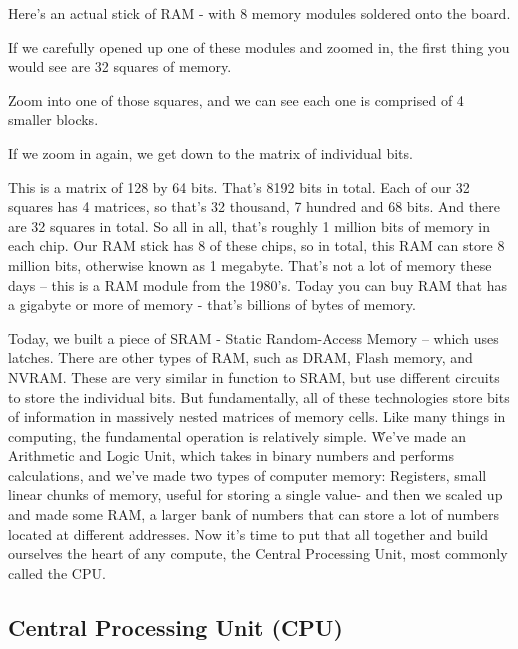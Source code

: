 \be
Here's an actual stick of RAM - with 8 memory modules soldered onto the board.


If we carefully opened up one of these modules and zoomed in, the first thing you would see are 32 squares of memory.


Zoom into one of those squares, and we can see each one is comprised of 4 smaller blocks.


If we zoom in again, we get down to the matrix of individual bits.


This is a matrix of 128 by 64 bits. That's 8192 bits in total. Each of our 32 squares has 4 matrices, so that's 32
thousand, 7 hundred and 68 bits. And there are 32 squares in total. So all in all, that's roughly 1 million bits of
memory in each chip. Our RAM stick has 8 of these chips, so in total, this RAM can store 8 million bits, otherwise
known as 1 megabyte. That's not a lot of memory these days -- this is a RAM module from the 1980's. Today you can buy
RAM that has a gigabyte or more of memory - that's billions of bytes of memory.
\ee

Today, we built a piece of SRAM - Static Random-Access Memory – which uses latches. There are other types of RAM,
such as DRAM, Flash memory, and NVRAM. These are very similar in function to SRAM, but use different circuits to
store the individual bits. But fundamentally, all of these technologies store bits of information in massively nested
matrices of memory cells. Like many things in computing, the fundamental operation is relatively simple. \v

We've made an Arithmetic and Logic Unit, which takes in binary numbers and performs calculations, and we've made two
types of computer memory: Registers, small linear chunks of memory, useful for storing a single value- and then we
scaled up and made some RAM, a larger bank of numbers that can store a lot of numbers located at different addresses.
Now it's time to put that all together and build ourselves the heart of any compute, the Central Processing Unit,
most commonly called the CPU.

\subsection{Central Processing Unit (CPU)}

